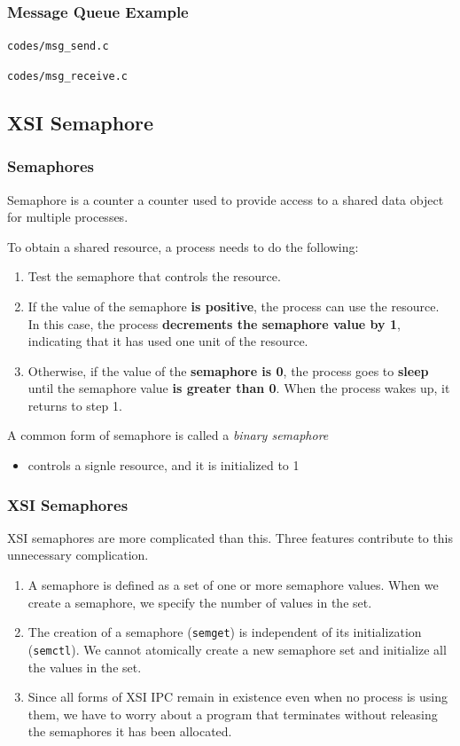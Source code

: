 \documentclass[newPxFont,sthlmFooter,nooffset]{beamer}
\begin{document}
\begin{frame}
  \frametitle{Message Queue Example}
\bigskip
\texttt{codes/msg\_send.c}


\newpage
\bigskip
\texttt{codes/msg\_receive.c}

\end{frame}

\subsection{XSI Semaphore}

\begin{frame}[t]
  \frametitle{Semaphores}
Semaphore is a counter a counter used to provide access to a shared data object for multiple processes.

To obtain a shared resource, a process needs to do the following:
\begin{enumerate}
\item Test the semaphore that controls the resource.
\item If the value of the semaphore \textbf{is positive}, the process can use the resource. In this case, the process \textbf{decrements the semaphore value by 1}, indicating that it has used one unit of the resource.
\item Otherwise, if the value of the \textbf{semaphore is 0}, the process goes to \textbf{sleep} until the semaphore value \textbf{is greater than 0}. When the process wakes up, it returns to step 1.
\end{enumerate}
A common form of semaphore is called a \textit{binary semaphore}
\begin{itemize}
\item controls a signle resource, and it is initialized to 1
\end{itemize}

\end{frame}



\begin{frame}[t]
  \frametitle{XSI Semaphores}
XSI semaphores are more complicated than this. Three features contribute to this unnecessary complication.
\begin{enumerate}
\item A semaphore is defined as a set of one or more semaphore values. When we create a semaphore, we specify the number of values in the set.
\item The creation of a semaphore (\texttt{semget}) is independent of its initialization (\texttt{semctl}).  We cannot atomically create a new semaphore set and initialize all the values in the set.
\item Since all forms of XSI IPC remain in existence even when no process is using them, we have to worry about a program that terminates without releasing the semaphores it has been allocated.
\end{enumerate}
\end{frame}
\end{document}
